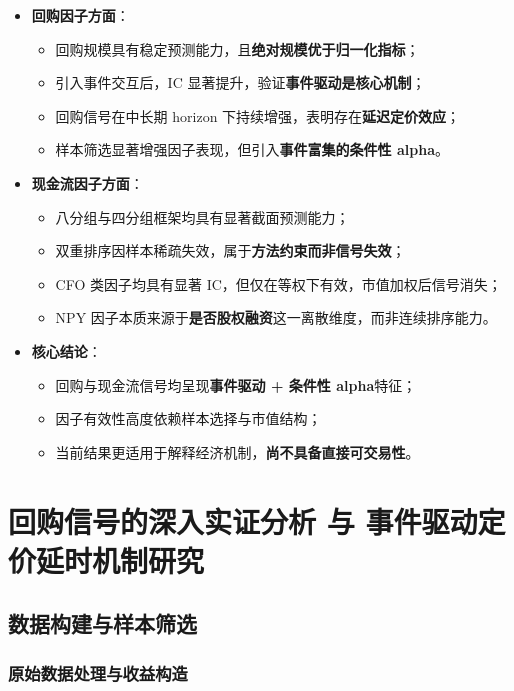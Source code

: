 \documentclass[a4paper,10pt]{article}
\begin{document}
\begin{itemize}
    \item \textbf{回购因子方面}：
    \begin{itemize}
        \item 回购规模具有稳定预测能力，且\textbf{绝对规模优于归一化指标}；
        \item 引入事件交互后，IC 显著提升，验证\textbf{事件驱动是核心机制}；
        \item 回购信号在中长期 horizon 下持续增强，表明存在\textbf{延迟定价效应}；
        \item 样本筛选显著增强因子表现，但引入\textbf{事件富集的条件性 alpha}。
    \end{itemize}
    
    \item \textbf{现金流因子方面}：
    \begin{itemize}
        \item 八分组与四分组框架均具有显著截面预测能力；
        \item 双重排序因样本稀疏失效，属于\textbf{方法约束而非信号失效}；
        \item CFO 类因子均具有显著 IC，但仅在等权下有效，市值加权后信号消失；
        \item NPY 因子本质来源于\textbf{是否股权融资}这一离散维度，而非连续排序能力。
    \end{itemize}
    
    \item \textbf{核心结论}：
    \begin{itemize}
        \item 回购与现金流信号均呈现\textbf{事件驱动 + 条件性 alpha}特征；
        \item 因子有效性高度依赖样本选择与市值结构；
        \item 当前结果更适用于解释经济机制，\textbf{尚不具备直接可交易性}。
    \end{itemize}
\end{itemize}


\section{回购信号的深入实证分析 与 事件驱动定价延时机制研究}


\subsection{数据构建与样本筛选}

\subsubsection{原始数据处理与收益构造}
\end{document}
